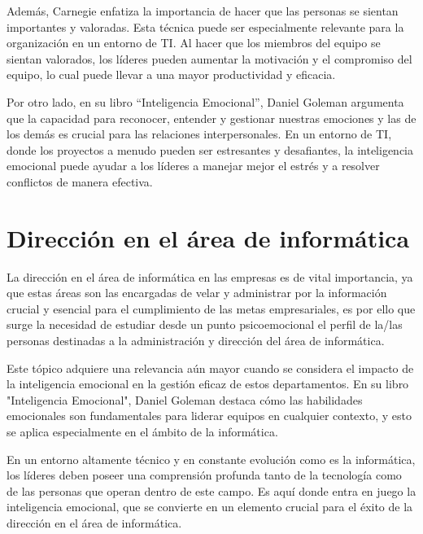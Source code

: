 \documentclass[journal]{IEEEtran}
\begin{document}
Además, Carnegie enfatiza la importancia de hacer que las personas se sientan importantes y valoradas. Esta técnica puede ser especialmente relevante para la organización en un entorno de TI. Al hacer que los miembros del equipo se sientan valorados, los líderes pueden aumentar la motivación y el compromiso del equipo, lo cual puede llevar a una mayor productividad y eficacia.

Por otro lado, en su libro “Inteligencia Emocional”, Daniel Goleman argumenta que la capacidad para reconocer, entender y gestionar nuestras emociones y las de los demás es crucial para las relaciones interpersonales. En un entorno de TI, donde los proyectos a menudo pueden ser estresantes y desafiantes, la inteligencia emocional puede ayudar a los líderes a manejar mejor el estrés y a resolver conflictos de manera efectiva.


\section{Dirección en el área de informática}
La dirección en el área de informática en las empresas es de vital importancia, ya que estas áreas son las encargadas de velar y administrar por la información crucial y esencial para el cumplimiento de las metas empresariales, es por ello que surge la necesidad de estudiar desde un punto psicoemocional el perfil de la/las personas destinadas a la administración y dirección del área de informática.

Este tópico adquiere una relevancia aún mayor cuando se considera el impacto de la inteligencia emocional en la gestión eficaz de estos departamentos. En su libro "Inteligencia Emocional", Daniel Goleman destaca cómo las habilidades emocionales son fundamentales para liderar equipos en cualquier contexto, y esto se aplica especialmente en el ámbito de la informática.

En un entorno altamente técnico y en constante evolución como es la informática, los líderes deben poseer una comprensión profunda tanto de la tecnología como de las personas que operan dentro de este campo. Es aquí donde entra en juego la inteligencia emocional, que se convierte en un elemento crucial para el éxito de la dirección en el área de informática.
\end{document}
